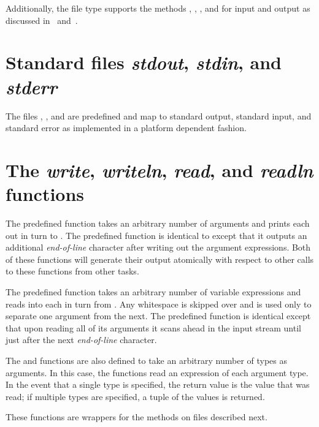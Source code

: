 Additionally, the file type supports the
methods , , , and  for 
input and output as discussed in~ and~.

\section{Standard files {\em stdout}, {\em stdin}, and {\em stderr}}

The files , , and  are
predefined and map to standard output, standard input, and standard
error as implemented in a platform dependent fashion.

\section{The {\em write}, {\em writeln}, {\em read}, and {\em readln} 
functions}

The predefined function  takes an arbitrary number of
arguments and prints each out in turn to .  The predefined
function  is identical to  except that it
outputs an additional {\em end-of-line} character after writing out
the argument expressions.  Both of these functions will generate their
output atomically with respect to other calls to these functions from
other tasks.

The predefined function  takes an arbitrary number of
variable expressions and reads into each in turn from .
Any whitespace is skipped over and is used only to separate one
argument from the next.  The predefined function  is
identical except that upon reading all of its arguments it scans ahead
in the input stream until just after the next {\em end-of-line}
character.

The  and  functions are also defined to take
an arbitrary number of types as arguments.  In this case, the
functions read an expression of each argument type.  In the event that
a single type is specified, the return value is the value that was
read; if multiple types are specified, a tuple of the values is
returned.

These functions are wrappers for the methods on files described next.

